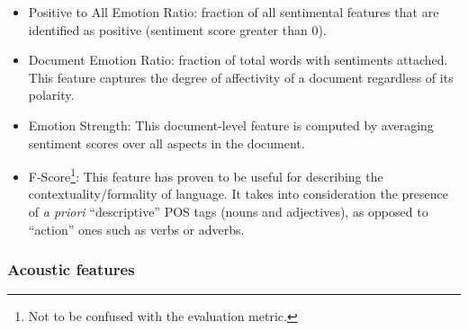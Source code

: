 \begin{itemize}
    \item Positive to All Emotion Ratio: fraction of all sentimental features that are identified as positive (sentiment score greater than 0). 
    \item Document Emotion Ratio: fraction of total words with sentiments attached. This feature captures the degree of affectivity of a document regardless of its polarity.
    \item Emotion Strength: This document-level feature is computed by averaging sentiment scores over all aspects in the document.
    \item F-Score\footnote{Not to be confused with the evaluation metric.}: This feature has proven to be useful for describing the contextuality/formality of language. It takes into consideration the presence of \textit{a priori} ``descriptive'' POS tags (nouns and adjectives), as opposed to ``action'' ones such as verbs or adverbs.
    
\end{itemize}

\subsubsection{Acoustic features}

